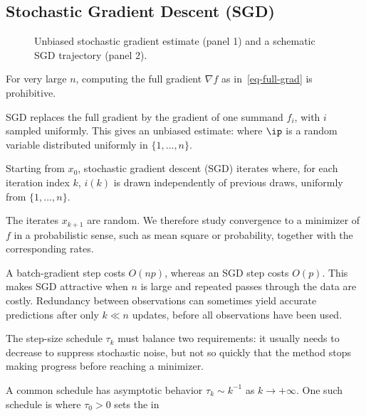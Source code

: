                                                         
\subsection{Stochastic Gradient Descent (SGD)}

\begin{figure}[tbp]
\centering
{}\hfill
{}
\caption{Unbiased stochastic gradient estimate (panel 1) and a schematic SGD trajectory (panel 2).}
\label{fig-review-advanced-unbiased-gradient}
\label{fig-review-advanced-sgd-trajectory}
\end{figure}
For very large $n$, computing the full gradient $\nabla f$ as in~\eqref{eq-full-grad} is prohibitive.  
 
SGD replaces the full gradient by the gradient of one summand $f_{i}$, with $i$ sampled uniformly. This gives an unbiased estimate:
where $\ip$ is a random variable distributed uniformly in $\{1,\ldots,n\}$.


Starting from $x_0$, stochastic gradient descent (SGD) iterates
where, for each iteration index $k$, $i(k)$
is drawn independently of previous draws, uniformly from $\{1,\ldots,n\}$.
 
The iterates $x_{k+1}$ are random. We therefore study convergence to a minimizer of $f$ in a probabilistic sense, such as mean square or probability, together with the corresponding rates.

A batch-gradient step costs $O(np)$,
whereas an SGD step costs $O(p)$. This makes SGD attractive
when $n$ is large and repeated passes through the data are costly.
Redundancy between observations can sometimes yield
accurate predictions after only $k \ll n$ updates, before all
observations have been used.

The step-size schedule $\tau_k$ must balance two requirements: it
usually needs to decrease to suppress stochastic noise,
but not so quickly that the method stops making progress
before reaching a minimizer.


A common schedule has asymptotic behavior $\tau_k \sim k^{-1}$
as $k\rightarrow +\infty$. One such schedule is
where $\tau_0>0$ sets the in
